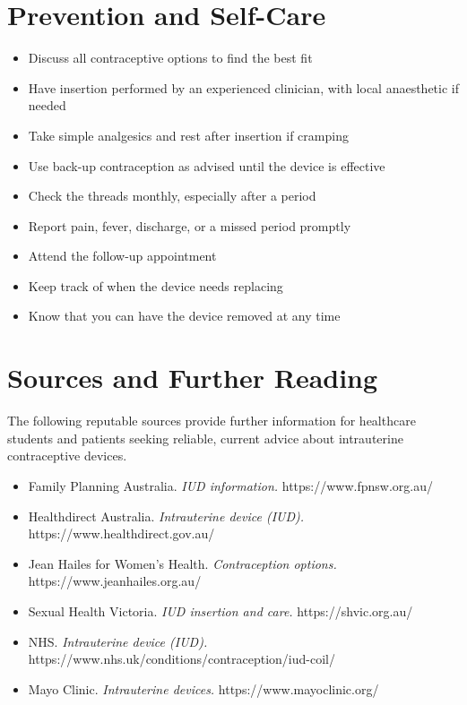 \section*{Prevention and Self-Care}
\begin{itemize}
    \item Discuss all contraceptive options to find the best fit
    \item Have insertion performed by an experienced clinician, with local anaesthetic if needed
    \item Take simple analgesics and rest after insertion if cramping
    \item Use back-up contraception as advised until the device is effective
    \item Check the threads monthly, especially after a period
    \item Report pain, fever, discharge, or a missed period promptly
    \item Attend the follow-up appointment
    \item Keep track of when the device needs replacing
    \item Know that you can have the device removed at any time
\end{itemize}

\section*{Sources and Further Reading}
The following reputable sources provide further information for healthcare students and patients seeking reliable, current advice about intrauterine contraceptive devices.
\begin{itemize}
    \item Family Planning Australia. \textit{IUD information.} https://www.fpnsw.org.au/
    \item Healthdirect Australia. \textit{Intrauterine device (IUD).} https://www.healthdirect.gov.au/
    \item Jean Hailes for Women's Health. \textit{Contraception options.} https://www.jeanhailes.org.au/
    \item Sexual Health Victoria. \textit{IUD insertion and care.} https://shvic.org.au/
    \item NHS. \textit{Intrauterine device (IUD).} https://www.nhs.uk/conditions/contraception/iud-coil/
    \item Mayo Clinic. \textit{Intrauterine devices.} https://www.mayoclinic.org/
\end{itemize}
